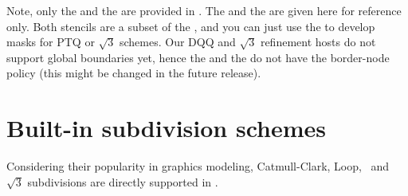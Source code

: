 Note, only the  and the 
are provided in .
The  and the  are given
here for reference only. Both stencils are a subset of the
, and you can just use the 
 to develop masks for PTQ or $\sqrt{3}$ 
schemes. Our DQQ and $\sqrt{3}$ refinement hosts do
not support global boundaries yet, hence the
 and the  do not
have the border-node policy (this might be changed in the 
future release). 







\section{Built-in subdivision schemes}
Considering their popularity in graphics modeling, 
Catmull-Clark, Loop, \DS\ and $\sqrt{3}$ subdivisions are directly
supported in . 

